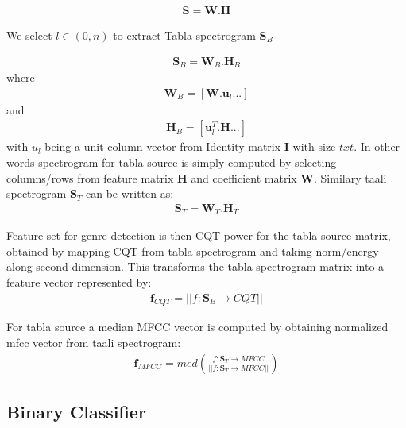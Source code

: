 \documentclass{article}
\begin{document}
\begin{align}\label{eq:eq1}
\boldsymbol{S} = \boldsymbol{W}.\boldsymbol{H}
\end{align}

We select $l \in (0,n)$ to extract Tabla spectrogram $\boldsymbol{S}_{B}$ 

\begin{align}\label{eq:eq2}
\boldsymbol{S}_{B} = \boldsymbol{W}_{B}.\boldsymbol{H}_{B}
\end{align}
where
\begin{align}\label{eq:eq3}
\boldsymbol{W}_{B} = [\boldsymbol{W}.\boldsymbol{u}_{l} ...]
\end{align}
and 
\begin{align}\label{eq:eq4}
\boldsymbol{H}_{B} = [\boldsymbol{u}_{l}^T.\boldsymbol{H} ...]
\end{align}
with $u_{l}$ being a unit column vector from Identity matrix $\boldsymbol{I}$ with size $txt$. In other words spectrogram for tabla source is simply computed
by selecting columns/rows from feature matrix $\boldsymbol{H}$ and coefficient matrix $\boldsymbol{W}$. Similary taali spectrogram $\boldsymbol{S}_{T}$ can be written as:
\begin{align}\label{eq:eq5}
\boldsymbol{S}_{T} = \boldsymbol{W}_{T}.\boldsymbol{H}_{T}
\end{align}

Feature-set for genre detection is then CQT power for the tabla source matrix, obtained by mapping CQT from tabla spectrogram and taking norm/energy along second dimension. This transforms the tabla spectrogram matrix into a feature vector represented by:
\begin{align}\label{eq:eq6}
\boldsymbol{f}_{CQT} = \lvert \lvert f\colon \boldsymbol{S}_{B}\to CQT \rvert \rvert
\end{align}

For tabla source a median MFCC vector is computed by obtaining normalized mfcc vector from taali spectrogram:
\begin{align}\label{eq:eq7}
\boldsymbol{f}_{MFCC} = med(\frac{f\colon \boldsymbol{S}_{T}\to MFCC}{\lvert \lvert {f\colon \boldsymbol{S}_{T}\to MFCC} \rvert \rvert})
\end{align}

\subsection{Binary Classifier}
\end{document}
